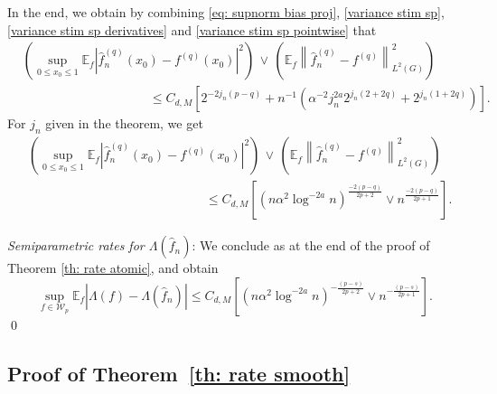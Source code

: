 \documentclass[preprint]{imsart}
\newcommand{\E}{{\mathbb E}}
\newcommand\norm[1]{\left\lVert#1\right\rVert}
\numberwithin{equation}{section}
\begin{document}
\begin{appendix}
In the end, we obtain by combining \eqref{eq: supnorm bias proj}, \eqref{variance stim sp}, \eqref{variance stim sp derivatives} and \eqref{variance stim sp pointwise} that
\begin{align}\label{eq: L2 risk deriv}
&\left(\underset{0\leq x_0\leq 1}{\sup}\mathbb{E}_f|\hat{f}_n^{(q)}(x_0) - f^{(q)}(x_0)|^2\right)\,\vee\, \left( \mathbb{E}_f\norm{\hat{f}_n^{(q)} - f^{(q)}}_{L^2(G)}^2\right)  \nonumber\\ &\qquad\qquad\qquad\qquad\qquad \leq C_{d,M}\left[ 2^{-2j_n(p-q)} + n^{-1}(\alpha^{-2}j_n^{2a} 2^{j_n(2+2q)} + 2^{j_n(1+2q)})\right].
\end{align}
For $j_n$ given in the theorem, we get
\begin{align*}
&\left(\underset{0\leq x_0\leq 1}{\sup}\mathbb{E}_f|\hat{f}_n^{(q)}(x_0) - f^{(q)}(x_0)|^2\right)\,\vee\, \left( \mathbb{E}_f\norm{\hat{f}_n^{(q)} - f^{(q)}}_{L^2(G)}^2\right)\nonumber\\&\qquad\qquad\qquad\qquad\qquad\qquad\qquad   \leq C_{d,M} \left[(n\alpha^2 \log^{-2a} n)^{\frac{-2(p-q)}{2p+2}}\vee n^{\frac{-2(p-q)}{2p+1}}\right].
\end{align*} 

\textit{Semiparametric rates for $\Lambda(\hat{f}_n)$}: We conclude as at the end of the proof of Theorem \ref{th: rate atomic}, and obtain 
\[
\underset{f\in\mathcal{W}_p}{\sup}\E_f|\Lambda(f)-\Lambda(\hat{f}_n)|\leq C_{d,M} \left[(n\alpha^2 \log^{-2a} n)^{-\frac{(p-s)}{2p+2}}\vee n^{-\frac{(p-s)}{2p+1}}\right].
\]
\hfill\qed



\subsection{Proof of Theorem~\ref{th: rate smooth}}



\end{appendix}
\end{document}
